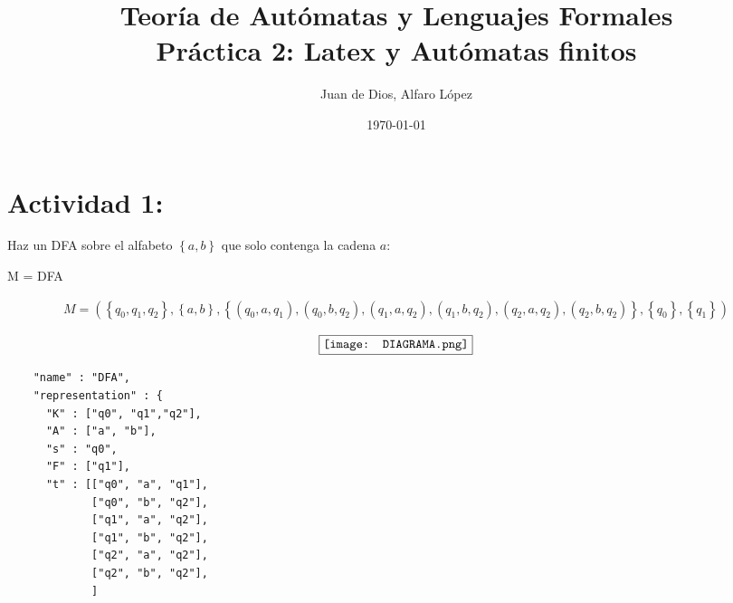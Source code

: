 \documentclass[fleqn, 10pt]{article}
\title{Teoría de Autómatas y Lenguajes Formales\\[.4\baselineskip]Práctica 2: Latex y Autómatas finitos}
\author{Juan de Dios, Alfaro López}
\date{\today}
\theoremstyle{plain}
\theoremstyle{definition}
\begin{document}
\maketitle

\section{Actividad 1:}

Haz un DFA sobre el alfabeto $\left\lbrace a,b \right\rbrace$ que solo contenga la cadena $a$:

M = DFA

\begin{ceqn}	%
    \begin{align*} %
     M = \left (\left\lbrace q_0,q_1,q_2\right\rbrace,\left\lbrace a,b \right\rbrace,\left\lbrace \left(q_0,a,q_1\right),\left(q_0,b,q_2\right),\left(q_1,a,q_2\right),\left(q_1,b,q_2\right),\left(q_2,a,q_2\right),\left(q_2,b,q_2\right) \right\rbrace,\left\lbrace q_0 \right\rbrace,\left\lbrace q_1 \right\rbrace \right)
    \end{align*} 
  \end{ceqn} 
  

\begin{ceqn}	%
    \begin{align*} %
    \fbox{\texttt{[image: DIAGRAMA.png]}}
    \end{align*} 
  \end{ceqn}
 \begin{verbatim}
    "name" : "DFA",
    "representation" : {
      "K" : ["q0", "q1","q2"],
      "A" : ["a", "b"],
      "s" : "q0",
      "F" : ["q1"],
      "t" : [["q0", "a", "q1"],
             ["q0", "b", "q2"],
             ["q1", "a", "q2"],
             ["q1", "b", "q2"],
             ["q2", "a", "q2"],
             ["q2", "b", "q2"],
             ]
 \end{verbatim}
\end{document}
